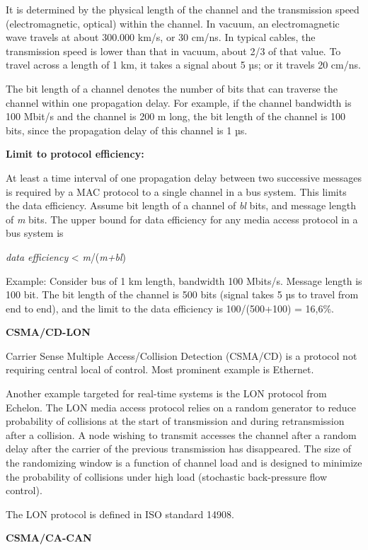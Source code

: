 It is determined by the physical length of the channel and the
transmission speed (electromagnetic, optical) within the channel. In
vacuum, an electromagnetic wave travels at about 300.000 km/s, or 30
cm/ns. In typical cables, the transmission speed is lower than that in
vacuum, about 2/3 of that value. To travel across a length of 1 km, it
takes a signal about 5 µs; or it travels 20 cm/ns.

The bit length of a channel denotes the number of bits that can traverse
the channel within one propagation delay. For example, if the channel
bandwidth is 100 Mbit/s and the channel is 200 m long, the bit length of
the channel is 100 bits, since the propagation delay of this channel is
1 µs.

\textbf{Limit to protocol efficiency:}

At least a time interval of one propagation delay between two successive
messages is required by a MAC protocol to a single channel in a bus
system. This limits the data efficiency. Assume bit length of a channel
of \emph{bl} bits, and message length of \emph{m} bits. The upper bound
for data efficiency for any media access protocol in a bus system is

\emph{data efficiency} \textless{} \emph{m}/(\emph{m+bl})

Example: Consider bus of 1 km length, bandwidth 100 Mbits/s. Message
length is 100 bit. The bit length of the channel is 500 bits (signal
takes 5 µs to travel from end to end), and the limit to the data
efficiency is 100/(500+100) = 16,6\%.

\textbf{CSMA/CD-LON}

Carrier Sense Multiple Access/Collision Detection (CSMA/CD) is a
protocol not requiring central local of control. Most prominent example
is Ethernet.

Another example targeted for real-time systems is the LON protocol from
Echelon. The LON media access protocol relies on a random generator to
reduce probability of collisions at the start of transmission and during
retransmission after a collision. A node wishing to transmit accesses
the channel after a random delay after the carrier of the previous
transmission has disappeared. The size of the randomizing window is a
function of channel load and is designed to minimize the probability of
collisions under high load (stochastic back-pressure flow control).

The LON protocol is defined in ISO standard 14908.

\textbf{CSMA/CA-CAN}

